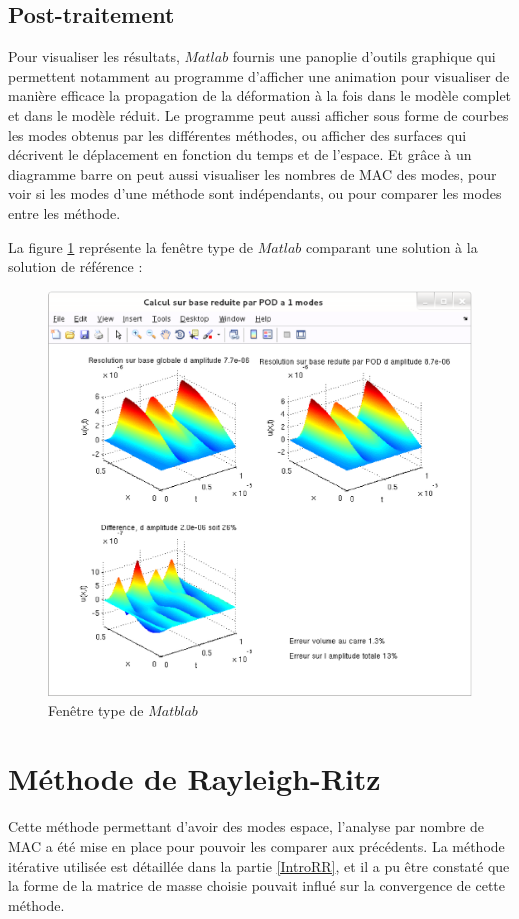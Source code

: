 \documentclass[12pt,a4paper]{report}
\begin{document}
\subsection{Post-traitement}
Pour visualiser les résultats, $Matlab$ fournis une panoplie d'outils graphique qui permettent notamment au programme d'afficher une animation pour visualiser de manière efficace la propagation de la déformation à la fois dans le modèle complet et dans le modèle réduit. Le programme peut aussi afficher sous forme de courbes les modes obtenus par les différentes méthodes, ou afficher des surfaces qui décrivent le déplacement en fonction du temps et de l'espace. Et grâce à un diagramme barre on peut aussi visualiser les nombres de MAC des modes, pour voir si les modes d'une méthode sont indépendants, ou pour comparer les modes entre les méthode.

La figure \ref{FenetreMatblabType} représente la fenêtre type de $Matlab$ comparant une solution à la solution de référence :
\begin{figure}[!ht]
\centering
\includegraphics[width=0.68\linewidth]{Images/FenetreType.eps}
\caption{Fenêtre type de $Matblab$ \label{FenetreMatblabType}}
\end{figure}

\section{Méthode de Rayleigh-Ritz}
Cette méthode permettant d'avoir des modes espace, l'analyse par nombre de MAC a été mise en place pour pouvoir les comparer aux précédents. La méthode itérative utilisée est détaillée dans la partie \ref{IntroRR}, et il a pu être constaté que la forme de la matrice de masse choisie pouvait influé sur la convergence de cette méthode.
\end{document}
